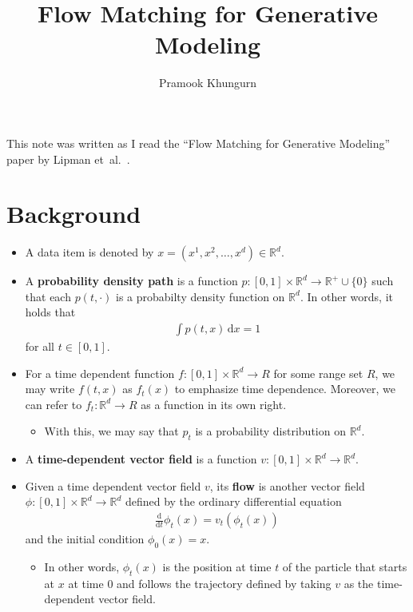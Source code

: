 \documentclass[10pt]{article}
\title{Flow Matching for Generative Modeling}
\author{Pramook Khungurn}
\newcommand{\dee}{\mathrm{d}}
\newcommand{\etal}{{et~al.}}
\newcommand{\Real}{\mathbb{R}}
\begin{document}
\maketitle

This note was written as I read the ``Flow Matching for Generative Modeling'' paper by Lipman \etal~\cite{Lipman:2023}.


\section{Background}

\begin{itemize}
  \item A data item is denoted by $x = (x^1, x^2, \dotsc, x^d) \in \Real^d$.
  
  \item A {\bf probability density path} is a function $p: [0,1] \times \Real^d \rightarrow \Real^{+} \cup \{0\}$ such that each $p(t,\cdot)$ is a probabilty density function on $\Real^d$. In other words, it holds that
  \begin{align*}
    \int p(t,x)\, \dee x = 1
  \end{align*}
  for all $t \in [0,1]$.

  \item For a time dependent function $f: [0,1] \times \Real^d \rightarrow R$ for some range set $R$, we may write $f(t,x)$ as $f_t(x)$ to emphasize time dependence. Moreover, we can refer to $f_t: \Real^d \rightarrow R$ as a function in its own right.
  \begin{itemize}
    \item With this, we may say that $p_t$ is a probability distribution on $\Real^d$. 
  \end{itemize}
  
  \item A {\bf time-dependent vector field} is a function $v: [0,1] \times \Real^d \rightarrow \Real^d$.
  
  \item Given a time dependent vector field $v$, its {\bf flow} is another vector field $\phi: [0,1] \times \Real^d \rightarrow \Real^d$ defined by the ordinary differential equation
  \begin{align*}
    \frac{\dee}{\dee t} \phi_t(x) = v_t(\phi_t(x))
  \end{align*}
  and the initial condition $\phi_0(x) = x$.
  \begin{itemize}
    \item In other words, $\phi_t(x)$ is the position at time $t$ of the particle that starts at $x$ at time $0$ and follows the trajectory defined by taking $v$ as the time-dependent vector field.
  \end{itemize}


\end{itemize}
\end{document}
